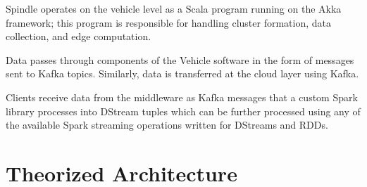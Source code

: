 \documentclass{thesis}
\begin{document}
    Spindle operates on the vehicle level as a Scala
    \cite{scala} program running on the Akka \cite{akka} framework; this program
    is responsible for handling cluster formation, data collection, and edge
    computation.

    Data passes through components of the Vehicle software in the form of 
    messages sent to Kafka \cite{kafka} topics. Similarly, data is transferred
    at the cloud layer using Kafka.

    Clients receive data from the middleware as Kafka messages that a custom Spark \cite{spark}
    library processes into DStream tuples which can be further processed using any of the available
    Spark streaming operations written for DStreams and RDDs.

\section{Theorized Architecture}
\end{document}
